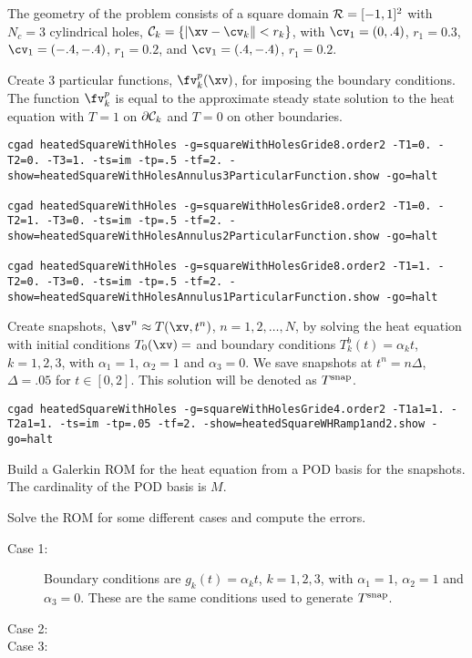 The geometry of the problem consists of a square domain $\mathcal{R} = [-1,1]^2$ with $N_c=3$ cylindrical holes, 
$\Cc_k=\{ \vert \xv - \cv_k \| < r_k \}$, with 
$\cv_1=(0,.4)$, $r_1=0.3$, 
$\cv_1=(-.4,-.4)$, $r_1=0.2$,  and 
$\cv_1=( .4,-.4)$, $r_1=0.2$.

 Create 3 particular functions, $\fv_k^p(\xv)$, 
for imposing the boundary conditions. The function $\fv_k^p$ is equal to the 
approximate steady state solution to the heat equation with $T=1$ on $\partial \mathcal{C}_k$ and $T=0$ on other boundaries.

{\scriptsize
\begin{verbatim}
cgad heatedSquareWithHoles -g=squareWithHolesGride8.order2 -T1=0. -T2=0. -T3=1. -ts=im -tp=.5 -tf=2. -show=heatedSquareWithHolesAnnulus3ParticularFunction.show -go=halt

cgad heatedSquareWithHoles -g=squareWithHolesGride8.order2 -T1=0. -T2=1. -T3=0. -ts=im -tp=.5 -tf=2. -show=heatedSquareWithHolesAnnulus2ParticularFunction.show -go=halt

cgad heatedSquareWithHoles -g=squareWithHolesGride8.order2 -T1=1. -T2=0. -T3=0. -ts=im -tp=.5 -tf=2. -show=heatedSquareWithHolesAnnulus1ParticularFunction.show -go=halt
\end{verbatim}
}

 Create snapshots, $\sv^n\approx T(\xv,t^n)$, $n=1,2,\ldots,N$,
 by solving the heat equation with initial conditions $T_0(\xv)=$ and
boundary conditions $T_k^b(t) = \alpha_k t$, $k=1,2,3$, with $\alpha_1=1$, $\alpha_2=1$ and $\alpha_3=0$. 
We save snapshots at $t^n=n\Delta$, $\Delta=.05$ for $t\in[0,2]$. 
This solution will be denoted as $T^{\rm snap}$. 

{\scriptsize
\begin{verbatim}
cgad heatedSquareWithHoles -g=squareWithHolesGride4.order2 -T1a1=1. -T2a1=1. -ts=im -tp=.05 -tf=2. -show=heatedSquareWHRamp1and2.show -go=halt
\end{verbatim}
}


 Build a Galerkin ROM for the heat equation from a POD basis for the snapshots. 
The cardinality of the POD basis is $M$.


 Solve the ROM for some different cases and compute the errors.
\begin{description}
  \item[Case 1:] Boundary conditions are $g_k(t) = \alpha_k t$, $k=1,2,3$, with $\alpha_1=1$, $\alpha_2=1$ and $\alpha_3=0$. These
    are the same conditions used to generate $T^{\rm snap}$.
  \item[Case 2:] 
  \item[Case 3:]
\end{description}


